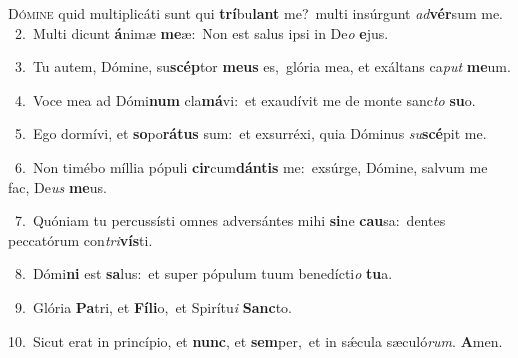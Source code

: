 \lettrine{\initial\textcolor{\initialcolor}{D}}{ómine} quid multiplicáti sunt qui \textbf{trí}\-bu\textbf{lant} me?~\star multi insúrgunt \textit{ad}\-\textbf{vér}sum me.\\
{\numbfont\textcolor{\numbcolor}{~2.}}~Multi dicunt \textbf{á}\-nimæ \textbf{me}\-æ:~\star Non est salus ipsi in De\textit{o} \textbf{e}\-jus.\par
{\numbfont\textcolor{\numbcolor}{~3.}}~Tu autem, Dómine, su\-\textbf{scép}\-tor \textbf{me}\-\textbf{us} es,~\star glória mea, et exáltans ca\textit{put} \textbf{me}\-um.\par
{\numbfont\textcolor{\numbcolor}{~4.}}~Voce mea ad Dómi\textbf{num} cla\-\textbf{má}\-vi:~\star et exaudívit me de monte sanc\textit{to} \textbf{su}\-o.\par
{\numbfont\textcolor{\numbcolor}{~5.}}~Ego dormívi, et \textbf{so}\-po\-\textbf{rá}\-\textbf{tus} sum:~\star et exsurréxi, quia Dóminus \textit{su}\-\textbf{scé}pit me.\par
{\numbfont\textcolor{\numbcolor}{~6.}}~Non timébo míllia pópuli \textbf{cir}\-cum\-\textbf{dán}\-\textbf{tis} me:~\star exsúrge, Dómine, salvum me fac, De\textit{us} \textbf{me}\-us.\par
{\numbfont\textcolor{\numbcolor}{~7.}}~Quóniam tu percussísti omnes adversántes mihi \textbf{si}\-ne \textbf{cau}\-sa:~\star dentes peccatórum con\-\textit{tri}\-\textbf{vís}ti.\par
{\numbfont\textcolor{\numbcolor}{~8.}}~Dómi\textbf{ni} est \textbf{sa}\-lus:~\star et super pópulum tuum benedícti\textit{o} \textbf{tu}\-a.\par
{\numbfont\textcolor{\numbcolor}{~9.}}~Glória \textbf{Pa}\-tri, et \textbf{Fí}\-\textbf{li}o,~\star et Spirítu\textit{i} \textbf{Sanc}\-to.\par
{\numbfont\textcolor{\numbcolor}{10.}}~Sicut erat in princípio, et \textbf{nunc}\-, et \textbf{sem}\-per,~\star et in sǽcula sæculó\-\textit{rum}\-. \textbf{A}\-men.\par
